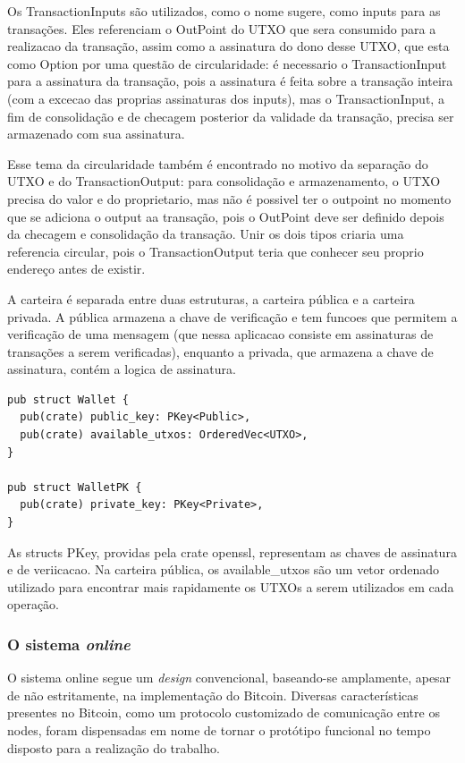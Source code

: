 \documentclass[
  12pt,
  a4paper,
  oneside,
  article,
]{abntex2}
\begin{document}
Os TransactionInputs são utilizados, como o nome sugere, como inputs para as transações. Eles referenciam o OutPoint do UTXO que sera consumido para a realizacao da transação, assim como a assinatura do dono desse UTXO, que esta como Option por uma questão de circularidade: é necessario o TransactionInput para a assinatura da transação, pois a assinatura é feita sobre a transação inteira (com a excecao das proprias assinaturas dos inputs), mas o TransactionInput, a fim de consolidação e de checagem posterior da validade da transação, precisa ser armazenado com sua assinatura.

Esse tema da circularidade também é encontrado no motivo da separação do UTXO e do TransactionOutput: para consolidação e armazenamento, o UTXO precisa do valor e do proprietario, mas não é possivel ter o outpoint no momento que se adiciona o output aa transação, pois o OutPoint deve ser definido depois da checagem e consolidação da transação. Unir os dois tipos criaria uma referencia circular, pois o TransactionOutput teria que conhecer seu proprio endereço antes de existir.

A carteira é separada entre duas estruturas, a carteira pública e a carteira privada. A pública armazena a chave de verificação e tem funcoes que permitem a verificação de uma mensagem (que nessa aplicacao consiste em assinaturas de transações a serem verificadas), enquanto a privada, que armazena a chave de assinatura, contém a logica de assinatura.

\begin{verbatim}
pub struct Wallet {
  pub(crate) public_key: PKey<Public>,
  pub(crate) available_utxos: OrderedVec<UTXO>,
}

pub struct WalletPK {
  pub(crate) private_key: PKey<Private>,
}
\end{verbatim}

As structs PKey, providas pela crate openssl, representam as chaves de assinatura e de veriicacao. Na carteira pública, os available_utxos são um vetor ordenado utilizado para encontrar mais rapidamente os UTXOs a serem utilizados em cada operação.

\subsubsection{O sistema \textit{online}}

O sistema online segue um \textit{design} convencional, baseando-se amplamente, apesar de não estritamente, na implementação do Bitcoin. Diversas características presentes no Bitcoin, como um protocolo customizado de comunicação entre os nodes, foram dispensadas em nome de tornar o protótipo funcional no tempo disposto para a realização do trabalho.
\end{document}
